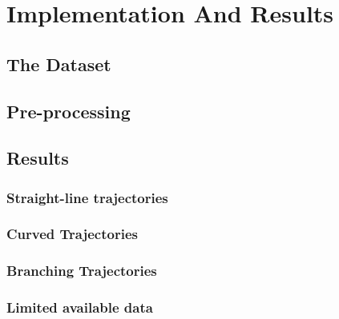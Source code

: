 \chapter{Implementation And Results}
\section{The Dataset}
\section{Pre-processing}
\section{Results}
\subsection{Straight-line trajectories}
\subsection{Curved Trajectories}
\subsection{Branching Trajectories}
\subsection{Limited available data}